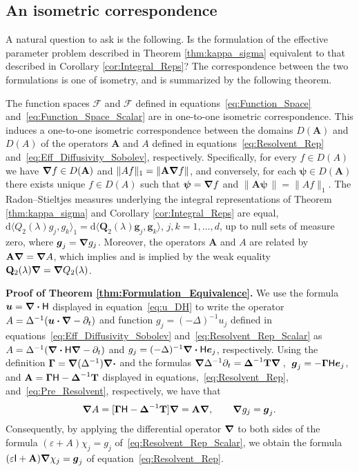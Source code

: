 \documentclass[leqno,onefignum,onetabnum]{siamltex1213}
\renewcommand{\d}{\mathrm{d}}
\newcommand{\Tb}{\mathbf{T}}
\newcommand{\Ab}{\mathbf{A}}
\newcommand{\Qb}{\mathbf{Q}}
\newcommand{\Fc}{\mathcal{F}}
\newcommand{\Hm}{\mathsf{H}}
\newcommand{\Ib}{\mathsf{I}}
\newcommand{\Fs}{\mathscr{F}}
\newcommand\bDelta{\mbox{\boldmath${\Delta}$}}
\newcommand\bGamma{\mbox{\boldmath${\Gamma}$}}
\newcommand\bnabla{\mbox{\boldmath${\nabla}$}}
\providecommand\bcdot{\boldsymbol{\cdot}}
\newcommand{\vecg}{\boldsymbol{g}}
\newcommand{\vecu}{\boldsymbol{u}}
\newcommand{\vece}{\boldsymbol{e}}
\newcommand{\vecpsi}{\boldsymbol{\psi}}
\begin{document}
\subsection{An isometric
  correspondence} \label{sec:Isometric_Correspondence} 
%
A natural question to ask is the following. Is the formulation of the
effective parameter problem described in Theorem \ref{thm:kappa_sigma}
equivalent to that described in Corollary \ref{cor:Integral_Reps}?
The correspondence between the two formulations is one of isometry,
and is summarized by the following theorem. 
%
\begin{theorem}\label{thm:Formulation_Equivalence}
%  
The function spaces $\Fc$ and $\Fs$ defined in
equations~\eqref{eq:Function_Space}
and~\eqref{eq:Function_Space_Scalar} are in one-to-one isometric
correspondence. This induces a one-to-one 
isometric correspondence between the domains $D(\Ab)$ and $D(A)$ of
the operators $\Ab$ and $A$ defined in
equations~\eqref{eq:Resolvent_Rep}
and~\eqref{eq:Eff_Diffusivity_Sobolev}, 
respectively. Specifically, for every $f\in D(A)$ we have
$\bnabla f\in D(\Ab)$ and $\|Af\|_1=\|\Ab\bnabla f\|$, and conversely, for each
$\vecpsi\in D(\Ab)$ there exists unique $f\in D(A)$ such that
$\vecpsi=\bnabla f$  and $\|\Ab\vecpsi\,\|=\|Af\|_1$. The Radon--Stieltjes
measures underlying the integral representations of Theorem
\ref{thm:kappa_sigma} and Corollary \ref{cor:Integral_Reps} are equal,
$\d\langle Q_2(\lambda)g_j,g_k\rangle_1=\d\langle\Qb_2(\lambda)\vecg_j,\vecg_k\rangle$, $j,k=1,\ldots,d$,
up to null sets of measure zero, where
$\vecg_j=\bnabla g_j$. Moreover, the operators $\Ab$ and $A$ are
related by $\Ab\bnabla =\bnabla A$, which implies and is implied by the
weak equality $\Qb_2(\lambda)\bnabla =\bnabla Q_2(\lambda)$.
%
\end{theorem}
%

\textbf{Proof of Theorem \ref{thm:Formulation_Equivalence}.}\hspace{1ex}
%
We use the formula $\vecu =\bnabla \bcdot\Hm$ displayed in
equation~\eqref{eq:u_DH} to write the operator $A=\Delta^{-1}(\vecu
\bcdot\bnabla -\partial_t)$ 
and function $g_j=(-\Delta)^{-1}u_j$ defined in
equations~\eqref{eq:Eff_Diffusivity_Sobolev}
and~\eqref{eq:Resolvent_Rep_Scalar} 
as $A=\Delta^{-1}(\bnabla \bcdot\Hm\bnabla -\partial_t)$ and
$g_j=(-\Delta)^{-1}\bnabla \bcdot\Hm\vece _j$, respectively. Using the definition
$\bGamma=\bnabla (\Delta^{-1})\bnabla \bcdot$ and the formulas
$\bnabla \Delta^{-1}\partial_t=\bDelta^{-1}\Tb\bnabla \,$,
$\;\vecg_j=-\bGamma\Hm\vece _j$, and $\Ab=\bGamma\Hm-\bDelta^{-1}\Tb$
displayed in equations,~\eqref{eq:Resolvent_Rep},
and~\eqref{eq:Pre_Resolvent}, respectively, we have that    
%
\begin{align}\label{eq:A_Ab_Relation}
  \bnabla A=[\bGamma\Hm-\bDelta^{-1}\Tb]\bnabla =\Ab\bnabla , \qquad
  \bnabla g_j=\vecg_j.
\end{align}
%
Consequently, by applying the
differential operator $\bnabla $ to both sides of the formula
$(\varepsilon+A)\chi_j=g_j$ of~\eqref{eq:Resolvent_Rep_Scalar}, we obtain the
formula  $(\varepsilon\Ib+\Ab)\bnabla \chi_j=\vecg_j$ of
equation~\eqref{eq:Resolvent_Rep}. 
\end{document}
